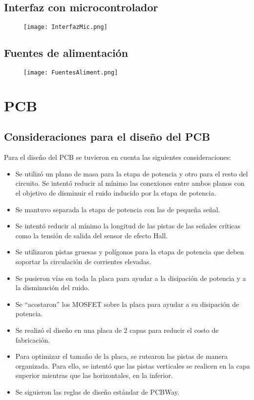 \subsection{Interfaz con microcontrolador}
\begin{figure}[H]
	\centering
	\texttt{[image: InterfazMic.png]}
	\label{fig:InterfazMic}
\end{figure}

\subsection{Fuentes de alimentación}
\begin{figure}[H]
	\centering
	\texttt{[image: FuentesAliment.png]}
	\label{fig:FuentesAliment}
\end{figure}

\section{PCB}
\subsection{Consideraciones para el diseño del PCB}
Para el diseño del PCB se tuvieron en cuenta las siguientes consideraciones:

\begin{itemize}
	\item Se utilizó un plano de masa para la etapa de potencia y otro para el resto del circuito. Se intentó reducir al mínimo las conexiones entre ambos planos con el objetivo de disminuir el ruido inducido por la etapa de potencia.
	\item Se mantuvo separada la etapa de potencia con las de pequeña señal.
	\item Se intentó reducir al mínimo la longitud de las pistas de las señales críticas como la tensión de salida del sensor de efecto Hall.
	\item Se utilizaron pistas gruesas y polígonos para la etapa de potencia que deben soportar la circulación de corrientes elevadas.
	\item Se pusieron vías en toda la placa para ayudar a la disipación de potencia y a la disminución del ruido. 
	\item Se ``acostaron'' los MOSFET sobre la placa para ayudar a su disipación de potencia.
	\item Se realizó el diseño en una placa de 2 capas para reducir el costo de fabricación.
	\item Para optimizar el tamaño de la placa, se rutearon las pistas de manera organizada. Para ello, se intentó que las pistas verticales se realicen en la capa superior mientras que las horizontales, en la inferior.
	\item Se siguieron las reglas de diseño estándar de PCBWay.
	
\end{itemize}



